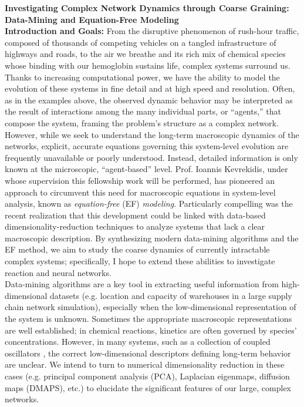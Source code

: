 \documentclass[11pt]{article}
\begin{document}
\noindent \textbf{\centering Investigating Complex Network Dynamics through Coarse Graining: \\ Data-Mining and Equation-Free Modeling \\}
\vspace*{2mm}
\noindent \textbf{Introduction and Goals:} From the disruptive phenomenon of rush-hour traffic, composed of thousands of competing vehicles on a tangled infrastructure of highways and roads, to the air we breathe and its rich mix of chemical species whose binding with our hemoglobin sustains life, complex systems surround us. Thanks to increasing computational power, we have the ability to model the evolution of these systems in fine detail and at high speed and resolution. Often, as in the examples above, the observed dynamic behavior may be interpreted as the result of interactions among the many individual parts, or ``agents,'' that compose the system, framing the problem's structure as a complex network. However, while we seek to understand the long-term macroscopic dynamics of the networks, explicit, accurate equations governing this system-level evolution are frequently unavailable or poorly understood. Instead, detailed information is only known at the microscopic, ``agent-based'' level. Prof. Ioannis Kevrekidis, under whose supervision this fellowship work will be performed, has pioneered an approach to circumvent this need for macroscopic equations in system-level analysis, known as \textit{equation-free} (EF) \textit{modeling}. Particularly compelling was the recent realization that this development could be linked with data-based dimensionality-reduction techniques to analyze systems that lack a clear macroscopic description. By synthesizing modern data-mining algorithms and the EF method, we aim to study the coarse dynamics of currently intractable complex systems; specifically, I hope to extend these abilities to investigate reaction and neural networks.\\
\indent Data-mining algorithms are a key tool in extracting useful information from high-dimensional datasets (e.g. location and capacity of warehouses in a large supply chain network simulation), especially when the low-dimensional representation of the system is unknown. Sometimes the appropriate macroscopic representations are well established; in chemical reactions, kinetics are often governed by species' concentrations. However, in many systems, such as a collection of coupled oscillators \cite{Rajendran2011}, the correct low-dimensional descriptors defining long-term behavior are unclear. We intend to turn to numerical dimensionality reduction in these cases (e.g. principal component analysis (PCA), Laplacian eigenmaps, diffusion maps (DMAPS), etc.) to elucidate the significant features of our large, complex networks.\\
\end{document}
